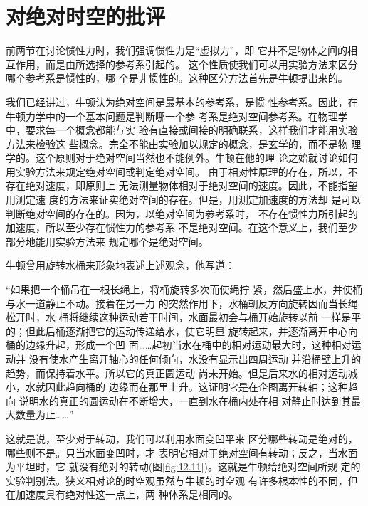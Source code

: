 \section{对绝对时空的批评}\label{sec:12.03}

前两节在讨论惯性力时，我们强调惯性力是“虚拟力”，即
它并不是物体之间的相互作用，而是由所选择的参考系引起的。
这个性质使我们可以用实验方法来区分哪个参考系是惯性的，哪
个是非惯性的。这种区分方法首先是牛顿提出来的。

我们已经讲过，牛顿认为绝对空间是最基本的参考系，是惯
性参考系。因此，在牛顿力学中的一个基本问题是判断哪一个参
考系是绝对空间参考系。在物理学中，要求每一个概念都能与实
验有直接或间接的明确联系，这样我们才能用实验方法来检验这
些概念。完全不能由实验加以规定的概念，是玄学的，而不是物
理学的。这个原则对于绝对空间当然也不能例外。牛顿在他的理
论之始就讨论如何用实验方法来规定绝对空间或判定绝对空间。
由于相对性原理的存在，所以，不存在绝对速度，即原则上
无法测量物体相对于绝对空间的速度。因此，不能指望用测定速
度的方法来证实绝对空间的存在。但是，用测定加速度的方法却
是可以判断绝对空间的存在的。因为，以绝对空间为参考系时，
不存在惯性力所引起的加速度，所以至少存在惯性力的参考系
不是绝对空间。在这个意义上，我们至少部分地能用实验方法来
规定哪个是绝对空间。

牛顿曾用旋转水桶来形象地表述上述观念，他写道：

\begin{quoting}
  “如果把一个桶吊在一根长绳上，将桶旋转多次而使绳拧
  紧，然后盛上水，并使桶与水一道静止不动。接着在另一力
  的突然作用下，水桶朝反方向旋转因而当长绳松开时，水
  桶将继续这种运动若干时间，水面最初会与桶开始旋转以前
  一样是平的；但此后桶逐渐把它的运动传递给水，使它明显
  旋转起来，并逐渐离开中心向桶的边缘升起，形成一个凹
  面……起初当水在桶中的相对运动最大时，这种相对运动并
  没有使水产生离开轴心的任何倾向，水没有显示出四周运动
  并沿桶壁上升的趋势，而保持着水平。所以它的真正圆运动
  尚未开始。但是后来水的相对运动减小，水就因此趋向桶的
  边缘而在那里上升。这证明它是在企图离开转轴；这种趋向
  说明水的真正的圆运动在不断增大，一直到水在桶内处在相
  对静止时达到其最大数量为止……”
\end{quoting}

这就是说，至少对于转动，我们可以利用水面变凹平来
区分哪些转动是绝对的，哪些则不是。只当水面变凹时，才
表明它相对于绝对空间有转动；反之，当水面为平坦时，它
就没有绝对的转动(图\ref{fig:12.11})。这就是牛顿给绝对空间所规
定的实验判别法。狭义相对论的时空观虽然与牛顿的时空观
有许多根本性的不同，但在加速度具有绝对性这一点上，两
种体系是相同的。

